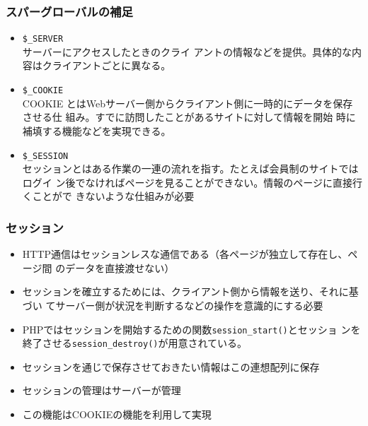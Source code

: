  \begin{frame}[containsverbatim]
 \frametitle{スパーグローバルの補足}
 \begin{itemize}
 \item {\texttt{\$\_SERVER}}\\
 サーバーにアクセスしたときのクライ
 アントの情報などを提供。具体的な内容はクライアントごとに異なる。
 \item \texttt{\$\_COOKIE}\\
 COOKIE とはWebサーバー側からクライアント側に一時的にデータを保存させる仕
 組み。すでに訪問したことがあるサイトに対して情報を開始
 時に補填する機能などを実現できる。
 \item \texttt{\$\_SESSION}\\
 セッションとはある作業の一連の流れを指す。たとえば会員制のサイトではログイ
 ン後でなければページを見ることができない。情報のページに直接行くことがで
 きないような仕組みが必要
 \end{itemize}
 \end{frame}
 \begin{frame}[containsverbatim]
 \frametitle{セッション}
 \begin{itemize}
 \item HTTP通信はセッションレスな通信である（各ページが独立して存在し、ページ間
 のデータを直接渡せない）
 \item セッションを確立するためには、クライアント側から情報を送り、それに基づい
 てサーバー側が状況を判断するなどの操作を意識的にする必要
 \item PHPではセッションを開始するための関数\texttt{session\_start()}とセッショ
 ンを終了させる\texttt{session\_destroy()}が用意されている。
 \item セッションを通じで保存させておきたい情報はこの連想配列に保存
 \item セッションの管理はサーバーが管理
 \item この機能はCOOKIEの機能を利用して実現
 \end{itemize}
 \end{frame}
